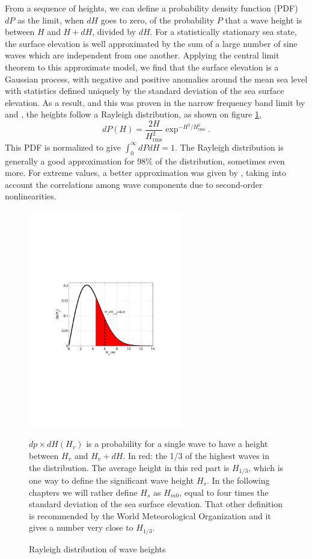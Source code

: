 From a sequence of heights, we can define a probability density function (PDF) $dP$ as the limit, when $dH$ 
goes to zero, of the probability $P$ that a wave height is between $H$ and $H+dH$, divided by $dH$. 
For a statistically stationary sea state, the surface elevation is well approximated by the sum of  a large number 
of sine waves which are independent from one another. Applying the central limit theorem to this 
approximate model, we find that the surface elevation is a Gaussian process, with negative and positive anomalies around the mean sea level 
with statistics defined uniquely by the standard deviation of the sea surface elevation. As a result, and this was proven in the narrow frequency band limit 
by \cite{Rice1944} and \cite{Cartwright&Longuet-Higgins1956}, the heights follow a Rayleigh distribution, as shown on figure \ref{fig:Rayleigh}, 
 \begin{equation}
dP(H)=\frac{2H}{H_{\mathrm{rms}}^2}
\exp^{-{H^2}/{H_{\mathrm{rms}}^2}}.
\end{equation}
This PDF is normalized to give 
$\int_0^\infty dP dH =1$. The Rayleigh distribution is generally a good approximation for 98\% of the distribution, sometimes even more. 
For extreme values, a better approximation was given by \cite{Tayfun1980}, taking into account the correlations among wave components due to 
second-order nonlinearities. 
\begin{figure}
\centerline{\includegraphics[width=0.6\textwidth]{FIGS_CH_INTRO/Rayleigh.pdf}}
  \caption{ Rayleigh distribution of wave heights}{$dp\times dH(H_v)$ is a probability for a single wave to have a height between  $H_v$ and $H_v+dH$. 
In red: the 1/3 of the highest waves in the distribution. The average height in this red part is $H_{1/3}$, which is one way to define the  significant wave height $H_s$. 
In the following chapters we will rather define $H_s$ as $H_{m0}$, equal to four times the standard deviation of the sea surface elevation. That other definition is 
recommended by the World Meteorological Organization and it gives a number 
very close to $H_{1/3}$.\label{fig:Rayleigh}}
\end{figure}
